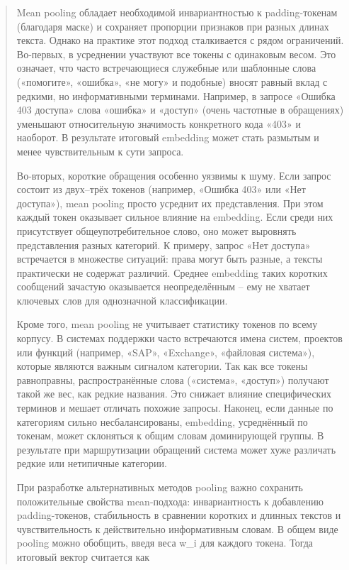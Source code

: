 \documentclass[
]{article}
\begin{document}
\begin{quote}
Mean pooling обладает необходимой инвариантностью к padding-токенам
(благодаря маске) и сохраняет пропорции признаков при разных длинах
текста. Однако на практике этот подход сталкивается с рядом ограничений.
Во-первых, в усреднении участвуют все токены с одинаковым весом. Это
означает, что часто встречающиеся служебные или шаблонные слова
(«помогите», «ошибка», «не могу» и подобные) вносят равный вклад с
редкими, но информативными терминами. Например, в запросе «Ошибка 403
доступа» слова «ошибка» и «доступ» (очень частотные в обращениях)
уменьшают относительную значимость конкретного кода «403» и наоборот. В
результате итоговый embedding может стать размытым и менее
чувствительным к сути запроса.

Во-вторых, короткие обращения особенно уязвимы к шуму. Если запрос
состоит из двух--трёх токенов (например, «Ошибка 403» или «Нет
доступа»), mean pooling просто усреднит их представления. При этом
каждый токен оказывает сильное влияние на embedding. Если среди них
присутствует общеупотребительное слово, оно может выровнять
представления разных категорий. К примеру, запрос «Нет доступа»
встречается в множестве ситуаций: права могут быть разные, а тексты
практически не содержат различий. Среднее embedding таких коротких
сообщений зачастую оказывается неопределённым -- ему не хватает ключевых
слов для однозначной классификации.

Кроме того, mean pooling не учитывает статистику токенов по всему
корпусу. В системах поддержки часто встречаются имена систем, проектов
или функций (например, «SAP», «Exchange», «файловая система»), которые
являются важным сигналом категории. Так как все токены равноправны,
распространённые слова («система», «доступ») получают такой же вес, как
редкие названия. Это снижает влияние специфических терминов и мешает
отличать похожие запросы. Наконец, если данные по категориям сильно
несбалансированы, embedding, усреднённый по токенам, может склоняться к
общим словам доминирующей группы. В результате при маршрутизации
обращений система может хуже различать редкие или нетипичные категории.

При разработке альтернативных методов pooling важно сохранить
положительные свойства mean-подхода: инвариантность к добавлению
padding-токенов, стабильность в сравнении коротких и длинных текстов и
чувствительность к действительно информативным словам. В общем виде
pooling можно обобщить, введя веса w\_i для каждого токена. Тогда
итоговый вектор считается как
\end{quote}
\end{document}
